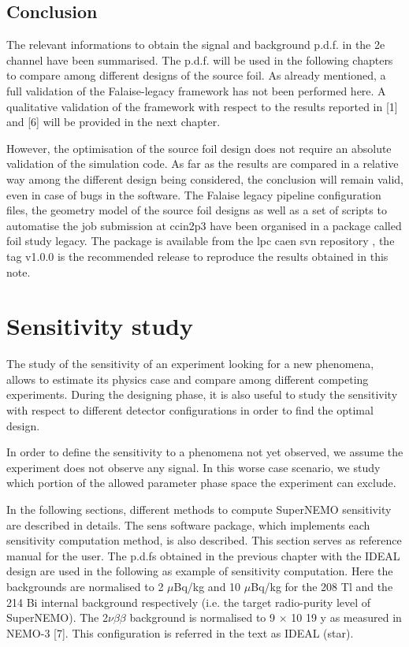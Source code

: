 \documentclass[main.tex]{subfiles}
\begin{document}
\subsection{Conclusion}


\NI The relevant informations to obtain the signal and background p.d.f. in the 2e channel have been summarised. The p.d.f. will be used in the following chapters to compare among different designs of the source foil. As already mentioned, a full validation of the Falaise-legacy framework has not been performed here. A qualitative validation of the framework with respect to the results reported in [1] and [6] will be provided in the next chapter.


\bigskip


\NI However, the optimisation of the source foil design does not require an absolute validation of the simulation code. As far as the results are compared in a relative way among the different design being considered, the conclusion will remain valid, even in case of bugs in the software. The Falaise legacy pipeline configuration files, the geometry model of the source foil designs as well as a set of scripts to automatise the job submission at ccin2p3 have been organised in a package called foil study legacy. The package is available from the lpc caen svn repository , the tag v1.0.0 is the recommended release to reproduce the results obtained in this note.


\section{Sensitivity study}


\NI The study of the sensitivity of an experiment looking for a new phenomena, allows to estimate its physics case and compare among different competing experiments. During the designing phase, it is also useful to study the sensitivity with respect to different detector configurations in order to find the optimal design.


\bigskip


\NI In order to define the sensitivity to a phenomena not yet observed, we assume the experiment does not observe any signal. In this worse case scenario, we study which portion of the allowed parameter phase space the experiment can exclude.


\bigskip


\NI In the following sections, different methods to compute SuperNEMO sensitivity are described in details. The sens software package, which implements each sensitivity computation method, is also described. This section serves as reference manual for the user. The p.d.fs obtained in the previous chapter with the IDEAL design are used in the following as example of sensitivity computation. Here the backgrounds are normalised to 2 $\mu$Bq/kg and 10 $\mu$Bq/kg for the 208 Tl and the 214 Bi internal background respectively (i.e. the target radio-purity level of SuperNEMO). The 2$\nu\beta\beta$ background is normalised to 9 $\times$ 10 19 y as measured in NEMO-3 [7]. This configuration is referred in the text as IDEAL (star).
\end{document}
